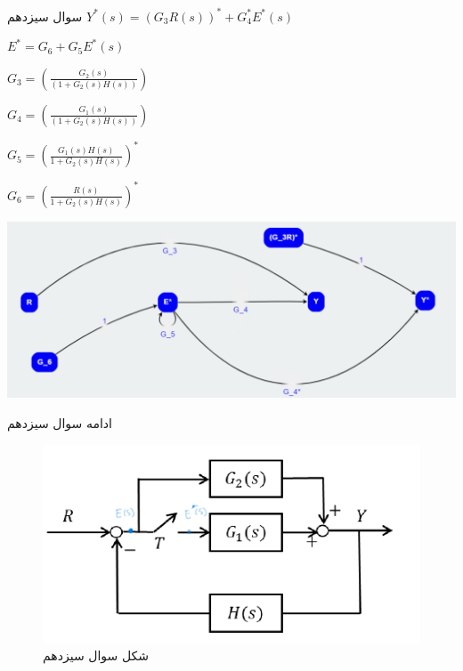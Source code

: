 \documentclass{article}
\begin{document}
\begin{problem}{سوال سیزدهم}
	$Y^*(s) = (G_3 R(s))^* +  G_4^* E^*(s) $
	
	$E^* = G_6 + G_5 E^*(s)$
	
	
	$G_3 = (\frac{G_2(s)}{(1 + G_2(s)H(s))}) $
	
	$G_4 = (\frac{G_1(s)}{(1 + G_2(s)H(s))})$
	
	$G_5 = (\frac{G_1(s)H(s)}{1 + G_2(s)H(s)})^*$
	
	$G_6 = (\frac{R(s)}{1 + G_2(s)H(s)})^* $ 
	
	\includegraphics[scale=0.7]{Second Series/13.png}
	
\end{problem}

\begin{problem}{ادامه سوال سیزدهم}
	\raggedleft
	
\end{problem}

\begin{figure}
	\includegraphics[width=\linewidth]{Second Series/7.png}
	\caption{شکل سوال سیزدهم}
\end{figure}
\end{document}
